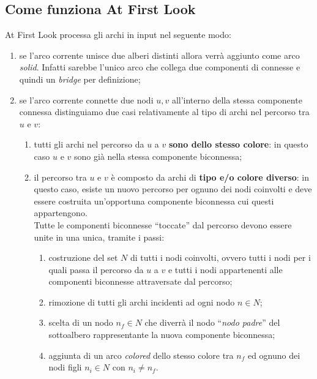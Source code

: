 \documentclass[a4paper,11pt]{report}
\begin{document}
\subsection{Come funziona At First Look}\label{Come funziona At First Look}
At First Look processa gli archi in input nel seguente modo:
\begin{enumerate}
 \item se l'arco corrente unisce due alberi distinti allora verrà aggiunto come arco \emph{solid}. Infatti sarebbe l'unico arco che collega
due componenti di connesse e quindi un 
\emph{bridge} per definizione;
 \item se l'arco corrente connette due nodi $u,v$ all'interno della stessa componente connessa distinguiamo due casi relativamente al tipo
di archi nel percorso tra $u$ e $v$:
 \begin{enumerate}
  \item tutti gli archi nel percorso da $u$ a $v$ \textbf{sono dello stesso colore}: in questo caso $u$ e $v$ sono già nella stessa
componente biconnessa;
  \item il percorso tra $u$ e $v$ è composto da archi di \textbf{tipo e/o colore diverso}: in questo caso, esiste un nuovo percorso per
ognuno dei nodi coinvolti e deve 
essere costruita un'opportuna componente biconnessa cui questi appartengono. \\Tutte le componenti biconnesse ``toccate'' dal percorso
devono essere unite in una unica, tramite i passi:
  \begin{enumerate}
   \item costruzione del set $N$ di tutti i nodi coinvolti, ovvero tutti i nodi per i quali passa il percorso da $u$ a $v$ e tutti i nodi
appartenenti alle componenti biconnesse
attraversate dal percorso;
   \item rimozione di tutti gli archi incidenti ad ogni nodo $n \in N$;
   \item scelta di un nodo $n_f \in N$ che diverrà il nodo ``\emph{nodo padre}'' del sottoalbero rappresentante la nuova componente
biconnessa;
   \item aggiunta di un arco \emph{colored} dello stesso colore tra $n_f$ ed ognuno dei nodi figli $n_i \in N$ con $n_i \neq n_f$.
  \end{enumerate}
 \end{enumerate}
\end{enumerate}
\end{document}

